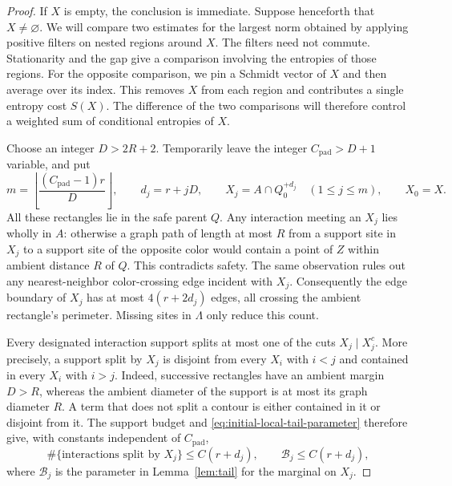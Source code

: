 \begin{proof}
If $X$ is empty, the conclusion is immediate.  Suppose henceforth that
$X\ne\varnothing$.  We will compare two estimates for the largest norm
obtained by applying positive filters on nested regions around $X$.
The filters need not commute.  Stationarity and the gap give a comparison
involving the entropies of those regions.  For the opposite comparison,
we pin a Schmidt vector of $X$ and then average over its index.  This
removes $X$ from each region and contributes a single entropy cost $S(X)$.
The difference of the two comparisons will therefore control a weighted
sum of conditional entropies of $X$.

Choose an integer $D>2R+2$.  Temporarily leave the integer
$C_{\mathrm{pad}}>D+1$ variable, and put
\[
 m=\left\lfloor\frac{(C_{\mathrm{pad}}-1)r}{D}\right\rfloor,
 \qquad d_j=r+jD,\qquad
 X_j=A\cap Q_0^{+d_j}\quad(1\le j\le m),\qquad X_0=X.
\]
All these rectangles lie in the safe parent $Q$.  Any interaction
meeting an $X_j$ lies wholly in $A$: otherwise a graph path of length
at most $R$ from a support site in $X_j$ to a support site of the
opposite color would contain a point of $Z$ within ambient distance
$R$ of $Q$.  This contradicts safety.  The same observation rules out
any nearest-neighbor color-crossing edge incident with $X_j$.
Consequently the edge boundary of $X_j$ has at most
$4(r+2d_j)$ edges, all crossing the ambient rectangle's perimeter.
Missing sites in $\Lambda$ only reduce this count.

Every designated interaction support splits at most one of the cuts
$X_j\mid X_j^c$.  More precisely, a support split by $X_j$ is disjoint
from every $X_i$ with $i<j$ and contained in every $X_i$ with $i>j$.
Indeed, successive rectangles have an ambient margin $D>R$, whereas
the ambient diameter of the support is at most its graph diameter
$R$.  A term that does not split a contour is either contained in it
or disjoint from it.  The support budget and
\eqref{eq:initial-local-tail-parameter} therefore give, with constants
independent of $C_{\mathrm{pad}}$,
\begin{equation}
 \#\{\text{interactions split by }X_j\}\le C(r+d_j),
 \qquad \mathcal B_j\le C(r+d_j),
 \label{eq:initial-contour-budget}
\end{equation}
where $\mathcal B_j$ is the parameter in Lemma~\ref{lem:tail} for the
marginal on $X_j$.


\end{proof}
